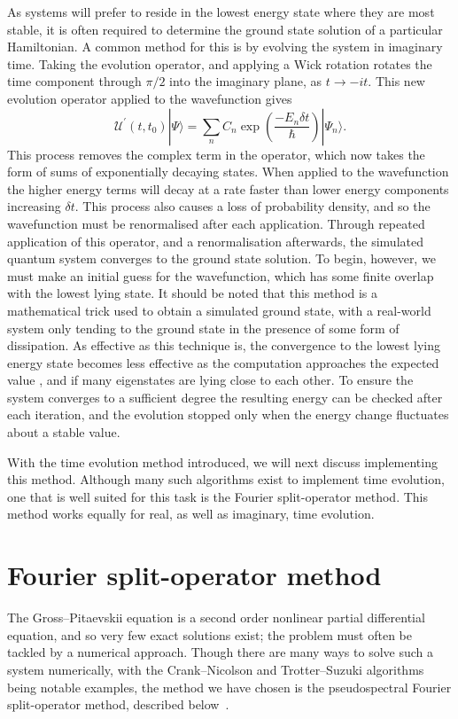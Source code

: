 As systems will prefer to reside in the lowest energy state where they are most stable, it is often required to determine the ground state solution of a particular Hamiltonian. A common method for this is by evolving the system in imaginary time. Taking the evolution operator, and applying a Wick rotation \cite{NUM:Bader_jcp_2013} rotates the time component through $\pi/2$ into the imaginary plane, as $t \rightarrow -it$. This new evolution operator applied to the wavefunction gives
\begin{equation}
       \mathscr{U^{'}}(t,t_0)|\Psi \rangle = \displaystyle\sum\limits_{n} C_n \exp\left(\frac{-{E_n}\delta t}{\hbar}\right)|\Psi_n \rangle.
\end{equation}
This process removes the complex term in the operator, which now takes the form of sums of exponentially decaying states. When applied to the wavefunction the higher energy terms will decay at a rate faster than lower energy components increasing $\delta t$. This process also causes a loss of probability density, and so the wavefunction must be renormalised after each application. Through repeated application of this operator, and a renormalisation afterwards, the simulated quantum system converges to the ground state solution. To begin, however, we must make an initial guess for the wavefunction, which has some finite overlap with the lowest lying state. It should be noted that this method is a mathematical trick used to obtain a simulated ground state, with a real-world system only tending to the ground state in the presence of some form of dissipation. As effective as this technique is, the convergence to the lowest lying energy state becomes less effective as the computation approaches the expected value \cite{Vtx:Danaila_pra_2005}, and if many eigenstates are lying close to each other. To ensure the system converges to a sufficient degree the resulting energy can be checked after each iteration, and the evolution stopped only when the energy change fluctuates about a stable value.

With the time evolution method introduced, we will next discuss implementing this method. Although many such algorithms exist to implement time evolution, one that is well suited for this task is the Fourier split-operator method. This method works equally for real, as well as imaginary, time evolution.

\section{Fourier split-operator method}\label{sec:fso}
The Gross--Pitaevskii equation is a second order nonlinear partial differential equation, and so very few exact solutions exist; the problem must often be tackled by a numerical approach. Though there are many ways to solve such a system numerically, with the Crank--Nicolson and Trotter--Suzuki algorithms being notable examples, the method we have chosen is the pseudospectral Fourier split-operator method, described below~\cite{Num:Bauke_cpc_2011}.

